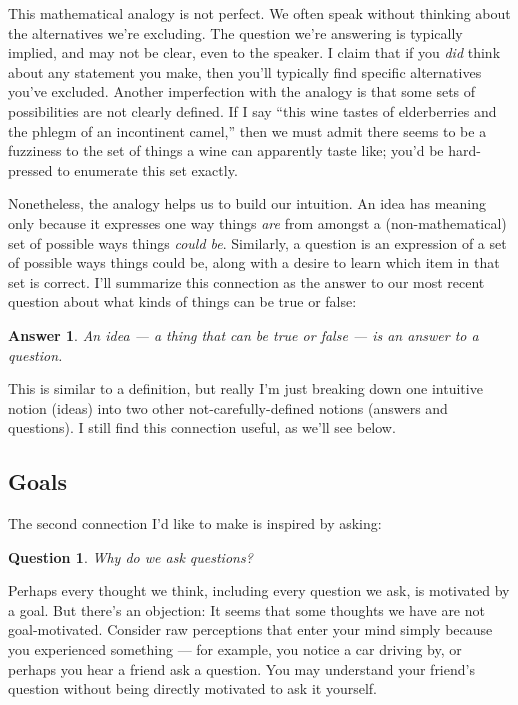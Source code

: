 \documentclass[11pt, oneside]{article}
\newtheorem*{answer}{Answer}
\newtheorem*{question*}{Question}
\theoremstyle{argtstyle}
\begin{document}
This mathematical analogy is not perfect.
We often speak without thinking about the
alternatives we're excluding.
The question we're answering
is typically implied, and may not be clear, even to
the speaker.
I claim that if you {\em did} think about any statement
you
make, then
you'll typically find specific alternatives you've excluded.
Another imperfection with the analogy is that some sets of possibilities are not
clearly defined.
If I say ``this wine tastes of
elderberries and the phlegm of an incontinent camel,'' then we must admit there
seems to be a fuzziness to the set of things a wine can apparently taste like;
you'd be hard-pressed to enumerate this set exactly.

Nonetheless, the analogy helps us to build our intuition.
An idea has meaning only because it expresses one way things
{\em are} from amongst a
(non-mathematical) set of possible ways things {\em could be}.
Similarly, a question is an expression of a set of possible ways things could
be, along with a desire to learn which item in that set is correct.
I'll summarize this
connection as the answer to our most recent question about what
kinds of things can be true or false:
\begin{answer}
An idea --- a thing that can be true or false --- is an answer to a question.
\end{answer}

This is similar to a definition, but really I'm just breaking down
one intuitive notion (ideas) into two other not-carefully-defined notions
(answers and questions). I still find this connection useful, as we'll see
below.

\subsection{Goals}

The second connection I'd like to make is inspired by asking:
\begin{question*}
    Why do we ask questions?
\end{question*}

Perhaps every thought we think, including every question we ask,
is motivated by a goal.
But there's an objection: It seems that some thoughts
we have are not goal-motivated.
Consider raw perceptions that enter your mind simply because
you experienced something --- for example, you notice a car driving by,
or perhaps you hear a friend ask a question. You may understand
your friend's question without being directly motivated to ask it yourself.
\end{document}
